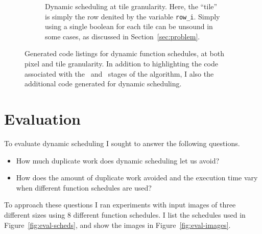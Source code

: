 \documentclass{article}
\begin{document}
\begin{figure}[h!]
\begin{center}
\begin{subfigure}[b]{0.475\textwidth}
\begin{center}
		\end{center}
		\caption{Dynamic scheduling at tile granularity. Here, the ``tile'' is simply the row denited by the variable \texttt{row\_i}. Simply using a single boolean for each tile can be unsound in some cases, as discussed in Section~\ref{sec:problem}.}
		\label{fig:dynamic-tile}
	\end{subfigure}
	\end{center}
	\caption{Generated code listings for dynamic function schedules, at both pixel and tile granularity. In addition to highlighting the code associated with the ~and ~stages of the algorithm, I also {\bf {}} the additional code generated for dynamic scheduling.}
	\label{fig:dynamic}
\end{figure}

\pagebreak

\section{Evaluation}

To evaluate dynamic scheduling I sought to answer the following questions.

\begin{itemize}
	\item How much duplicate work does dynamic scheduling let us avoid?
	\item How does the amount of duplicate work avoided and the execution time vary when different function schedules are used?
\end{itemize}

To approach these questions I ran experiments with input images of three different sizes using 8 different function schedules. I list the schedules used in Figure~\ref{fig:eval-scheds}, and show the images in Figure~\ref{fig:eval-images}.
\end{document}
